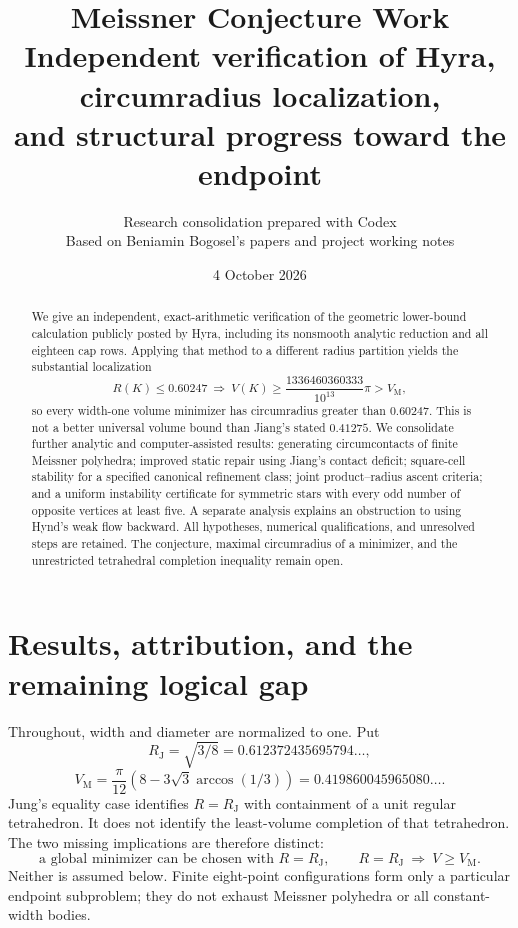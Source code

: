 \documentclass[11pt]{article}
\title{Meissner Conjecture Work\\\large Independent verification of Hyra, circumradius localization,\\and structural progress toward the endpoint}
\author{Research consolidation prepared with Codex\\\small Based on Beniamin Bogosel's papers and project working notes}
\date{4 October 2026}
\theoremstyle{remark}\newtheorem{remark}[theorem]{Remark}
\newcommand{\VM}{V_{\mathrm M}}
\newcommand{\RJ}{R_{\mathrm J}}
\begin{document}
\maketitle
\begin{abstract}
We give an independent, exact-arithmetic verification of the geometric lower-bound calculation publicly posted by Hyra, including its nonsmooth analytic reduction and all eighteen cap rows. Applying that method to a different radius partition yields the substantial localization
\[
 R(K)\leq0.60247\ \Longrightarrow\
 V(K)\geq\frac{1336460360333}{10^{13}}\pi>V_{\mathrm M},
\]
so every width-one volume minimizer has circumradius greater than $0.60247$.
This is not a better universal volume bound than Jiang's stated $0.41275$.
We consolidate further analytic and computer-assisted results: generating circumcontacts of finite Meissner polyhedra; improved static repair using Jiang's contact deficit; square-cell stability for a specified canonical refinement class; joint product--radius ascent criteria; and a uniform instability certificate for symmetric stars with every odd number of opposite vertices at least five. A separate analysis explains an obstruction to using Hynd's weak flow backward. All hypotheses, numerical qualifications, and unresolved steps are retained. The conjecture, maximal circumradius of a minimizer, and the unrestricted tetrahedral completion inequality remain open.
\end{abstract}
\tableofcontents
\clearpage
\section{Results, attribution, and the remaining logical gap}
Throughout, width and diameter are normalized to one. Put
\[
 \RJ=\sqrt{3/8}=0.612372435695794\ldots,
\]
\[
 \VM=\frac\pi{12}(8-3\sqrt3\arccos(1/3))
 =0.419860045965080\ldots.
\]
Jung's equality case identifies $R=\RJ$ with containment of a unit regular tetrahedron. It does not identify the least-volume completion of that tetrahedron.
The two missing implications are therefore distinct:
\[
 \text{a global minimizer can be chosen with }R=\RJ,
 \qquad R=\RJ\ \Longrightarrow\ V\geq\VM.
\]
Neither is assumed below. Finite eight-point configurations form only a particular endpoint subproblem; they do not exhaust Meissner polyhedra or all constant-width bodies.
\end{document}
